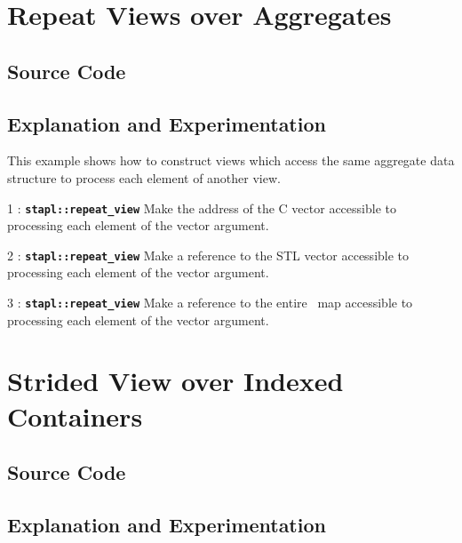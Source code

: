 \documentclass{report}
\begin{document}
\pagebreak
\section{Repeat Views over Aggregates}

\subsection{Source Code}



\subsection{Explanation and Experimentation}

This example shows how to construct views which access the same
aggregate data structure to process each element of another view.

\begin{hashitemize}
\item 1 : \texttt{{\bf stapl::repeat\_view}}
\newline
Make the address of the C vector accessible to processing each element
of the vector argument.

\item 2 : \texttt{{\bf stapl::repeat\_view}}
\newline
Make a reference to the STL vector accessible to processing
each element of the vector argument.

\item 3 : \texttt{{\bf stapl::repeat\_view}}
\newline
Make a reference to the entire \stapl\ map accessible to processing
each element of the vector argument.

\end{hashitemize}


\pagebreak
\section{Strided View over Indexed Containers}

\subsection{Source Code}



\subsection{Explanation and Experimentation}
\end{document}
